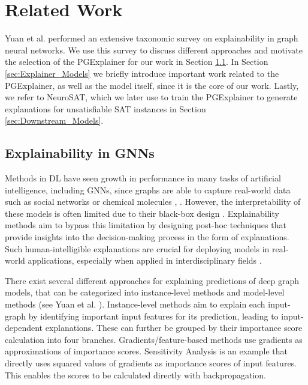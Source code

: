 \chapter{Related Work}

Yuan et al. \cite{yuan2022explainability} performed an extensive taxonomic survey on explainability in graph neural networks. We use this survey to discuss different approaches and motivate the selection of the PGExplainer for our work in Section \ref{sec:gnn_explainability}. In Section \ref{sec:Explainer_Models} we briefly introduce important work related to the PGExplainer, as well as the model itself, since it is the core of our work. Lastly, we refer to NeuroSAT, which we later use to train the PGExplainer to generate explanations for unsatisfiable SAT instances in Section \ref{sec:Downstream_Models}.


\section{Explainability in GNNs}
\label{sec:gnn_explainability}

Methods in DL have seen growth in performance in many tasks of artificial intelligence, including GNNs, since graphs are able to capture real-world data such as social networks or chemical molecules \cite{ying2018graph}, \cite{ma2021deep}. However, the interpretability of these models is often limited due to their black-box design \cite{noor2024survey}. Explainability methods aim to bypass this limitation by designing post-hoc techniques that provide insights into the decision-making process in the form of explanations. Such human-intelligible explanations are crucial for deploying models in real-world applications, especially when applied in interdisciplinary fields \cite{ribeiro2016should}. \bigskip

There exist several different approaches for explaining predictions of deep graph models, that can be categorized into instance-level methods and model-level methods (see Yuan et al.  \cite{yuan2022explainability}). Instance-level methods aim to explain each input-graph by identifying important input features for its prediction, leading to input-dependent explanations. These can further be grouped by their importance score calculation into four branches. Gradients/feature-based methods use gradients as approximations of importance scores. Sensitivity Analysis \cite{baldassarre2019explainability} is an example that directly uses squared values of gradients as importance scores of input features. This enables the scores to be calculated directly with backpropagation.

